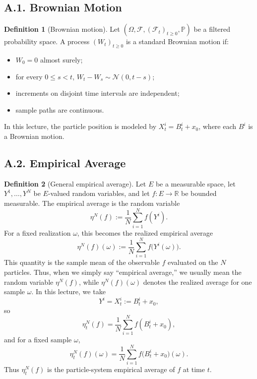 \documentclass[11pt]{article}
\theoremstyle{definition}
\newtheorem{definition}{Definition}
\theoremstyle{remark}
\begin{document}
\subsection*{A.1. Brownian Motion}
\begin{definition}[Brownian motion]
Let $(\Omega,\mathcal F,(\mathcal F_t)_{t\ge0},\mathbb P)$ be a filtered probability space. A process $(W_t)_{t\ge0}$ is a standard Brownian motion if:
\begin{itemize}
\item $W_0=0$ almost surely;
\item for every $0\le s<t$, $W_t-W_s\sim\mathcal N(0,t-s)$;
\item increments on disjoint time intervals are independent;
\item sample paths are continuous.
\end{itemize}
In this lecture, the particle position is modeled by $X_t^i=B_t^i+x_0$, where each $B^i$ is a Brownian motion.
\end{definition}

\subsection*{A.2. Empirical Average}
\begin{definition}[General empirical average]
Let $E$ be a measurable space, let $Y^1,\dots,Y^N$ be $E$-valued random variables, and let $f:E\to\mathbb R$ be bounded measurable. The empirical average is the random variable
\[
\eta^N(f):=\frac{1}{N}\sum_{i=1}^N f(Y^i).
\]
For a fixed realization $\omega$, this becomes the realized empirical average
\[
\eta^N(f)(\omega):=\frac{1}{N}\sum_{i=1}^N f\bigl(Y^i(\omega)\bigr).
\]
This quantity is the sample mean of the observable $f$ evaluated on the $N$ particles. Thus, when we simply say ``empirical average,'' we usually mean the random variable $\eta^N(f)$, while $\eta^N(f)(\omega)$ denotes the realized average for one sample $\omega$.
In this lecture, we take
\[
Y^i=X_t^i:=B_t^i+x_0,
\]
so
\[
\eta_t^N(f)=\frac{1}{N}\sum_{i=1}^N f(B_t^i+x_0),
\]
and for a fixed sample $\omega$,
\[
\eta_t^N(f)(\omega)=\frac{1}{N}\sum_{i=1}^N f\bigl(B_t^i+x_0\bigr)(\omega).
\]
Thus $\eta_t^N(f)$ is the particle-system empirical average of $f$ at time $t$.
\end{definition}
\end{document}
